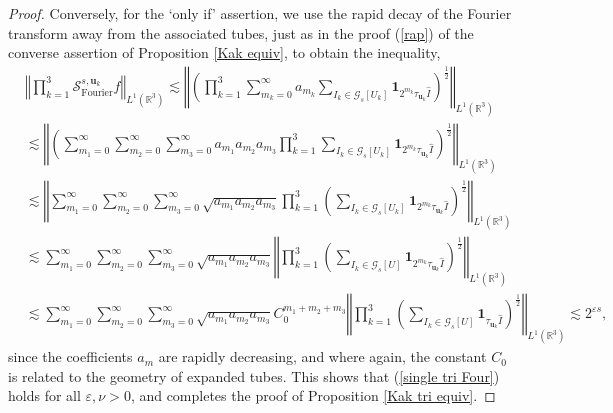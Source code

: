 \documentclass{amsart}%
\theoremstyle{plain}
\numberwithin{equation}{section}
\begin{document}
\begin{proof}
Conversely, for the `only if' assertion, we use the rapid decay of the Fourier
transform away from the associated tubes, just as in the proof (\ref{rap}) of
the converse assertion of Proposition \ref{Kak equiv}, to obtain the
inequality,%
\begin{align*}
&  \left\Vert \prod_{k=1}^{3}\mathcal{S}_{\operatorname*{Fourier}%
}^{s,\mathbf{u}_{k}}f\right\Vert _{L^{1}\left(  \mathbb{R}^{3}\right)
}\lesssim\left\Vert \left(  \prod_{k=1}^{3}\sum_{m_{k}=0}^{\infty}a_{m_{k}%
}\sum_{I_{k}\in\mathcal{G}_{s}\left[  U_{k}\right]  }\mathbf{1}_{2^{m_{k}}%
\tau_{\mathbf{u}_{k}}\widehat{I}}\right)  ^{\frac{1}{2}}\right\Vert
_{L^{1}\left(  \mathbb{R}^{3}\right)  }\\
&  \lesssim\left\Vert \left(  \sum_{m_{1}=0}^{\infty}\sum_{m_{2}=0}^{\infty
}\sum_{m_{3}=0}^{\infty}a_{m_{1}}a_{m_{2}}a_{m_{3}}\prod_{k=1}^{3}\sum
_{I_{k}\in\mathcal{G}_{s}\left[  U_{k}\right]  }\mathbf{1}_{2^{m_{k}}%
\tau_{\mathbf{u}_{k}}\widehat{I}}\right)  ^{\frac{1}{2}}\right\Vert
_{L^{1}\left(  \mathbb{R}^{3}\right)  }\\
&  \lesssim\left\Vert \sum_{m_{1}=0}^{\infty}\sum_{m_{2}=0}^{\infty}%
\sum_{m_{3}=0}^{\infty}\sqrt{a_{m_{1}}a_{m_{2}}a_{m_{3}}}\prod_{k=1}%
^{3}\left(  \sum_{I_{k}\in\mathcal{G}_{s}\left[  U_{k}\right]  }%
\mathbf{1}_{2^{m_{k}}\tau_{\mathbf{u}_{k}}\widehat{I}}\right)  ^{\frac{1}{2}%
}\right\Vert _{L^{1}\left(  \mathbb{R}^{3}\right)  }\\
&  \lesssim\sum_{m_{1}=0}^{\infty}\sum_{m_{2}=0}^{\infty}\sum_{m_{3}%
=0}^{\infty}\sqrt{a_{m_{1}}a_{m_{2}}a_{m_{3}}}\left\Vert \prod_{k=1}%
^{3}\left(  \sum_{I_{k}\in\mathcal{G}_{s}\left[  U\right]  }\mathbf{1}%
_{2^{m_{k}}\tau_{\mathbf{u}_{k}}\widehat{I}}\right)  ^{\frac{1}{2}}\right\Vert
_{L^{1}\left(  \mathbb{R}^{3}\right)  }\\
&  \lesssim\sum_{m_{1}=0}^{\infty}\sum_{m_{2}=0}^{\infty}\sum_{m_{3}%
=0}^{\infty}\sqrt{a_{m_{1}}a_{m_{2}}a_{m_{3}}}C_{0}^{m_{1}+m_{2}+m_{3}%
}\left\Vert \prod_{k=1}^{3}\left(  \sum_{I_{k}\in\mathcal{G}_{s}\left[
U\right]  }\mathbf{1}_{\tau_{\mathbf{u}_{k}}\widehat{I}}\right)  ^{\frac{1}%
{2}}\right\Vert _{L^{1}\left(  \mathbb{R}^{3}\right)  }\lesssim2^{\varepsilon
s},
\end{align*}
since the coefficients $a_{m}$ are rapidly decreasing, and where again, the
constant $C_{0}$ is related to the geometry of expanded tubes. This shows that
(\ref{single tri Four}) holds for all $\varepsilon,\nu>0$, and completes the
proof of Proposition \ref{Kak tri equiv}.
\end{proof}
\end{document}
